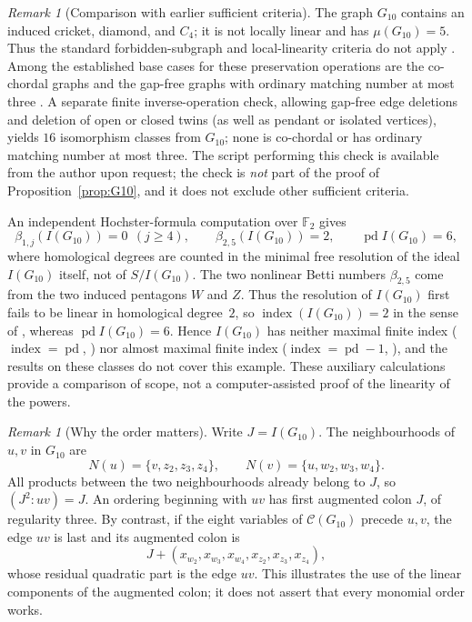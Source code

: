 \documentclass[11pt,a4paper]{article}
\theoremstyle{remark}\newtheorem{remark}[theorem]{Remark}
\newcommand{\pd}{\operatorname{pd}}
\newcommand{\Good}{\mathcal C}
\begin{document}
\begin{remark}[Comparison with earlier sufficient criteria]\label{rem:priority}
The graph $G_{10}$ contains an induced cricket, diamond, and $C_4$; it is not locally linear and has $\mu(G_{10})=5$. Thus the standard forbidden-subgraph and local-linearity criteria do not apply \cite{Banerjee,EreyDiamond,EreyC4,BBH}. Among the established base cases for these preservation operations are the co-chordal graphs \cite{HHZ} and the gap-free graphs with ordinary matching number at most three \cite{EHHKM}. A separate finite inverse-operation check, allowing gap-free edge deletions and deletion of open or closed twins (as well as pendant or isolated vertices), yields $16$ isomorphism classes from $G_{10}$; none is co-chordal or has ordinary matching number at most three. The script performing this check is available from the author upon request; the check is \emph{not} part of the proof of Proposition~\ref{prop:G10}, and it does not exclude other sufficient criteria.

An independent Hochster-formula computation over $\mathbb F_2$ gives
\[
 \beta_{1,j}(I(G_{10}))=0\ \ (j\ge4),\qquad \beta_{2,5}(I(G_{10}))=2,\qquad \pd I(G_{10})=6,
\]
where homological degrees are counted in the minimal free resolution of the ideal $I(G_{10})$ itself, not of $S/I(G_{10})$. The two nonlinear Betti numbers $\beta_{2,5}$ come from the two induced pentagons $W$ and $Z$. Thus the resolution of $I(G_{10})$ first fails to be linear in homological degree~$2$, so $\operatorname{index}(I(G_{10}))=2$ in the sense of \cite{BigdeliHZ}, whereas $\pd I(G_{10})=6$. Hence $I(G_{10})$ has neither maximal finite index ($\operatorname{index}=\pd$, \cite{BigdeliHZ}) nor almost maximal finite index ($\operatorname{index}=\pd-1$, \cite{Bigdeli}), and the results on these classes do not cover this example. These auxiliary calculations provide a comparison of scope, not a computer-assisted proof of the linearity of the powers.
\end{remark}

\begin{remark}[Why the order matters]
Write $J=I(G_{10})$. The neighbourhoods of $u,v$ in $G_{10}$ are
\[
 N(u)=\{v,z_2,z_3,z_4\},\qquad N(v)=\{u,w_2,w_3,w_4\}.
\]
All products between the two neighbourhoods already belong to $J$, so $(J^2:uv)=J$. An ordering beginning with $uv$ has first augmented colon $J$, of regularity three. By contrast, if the eight variables of $\Good(G_{10})$ precede $u,v$, the edge $uv$ is last and its augmented colon is
\[
 J+(x_{w_2},x_{w_3},x_{w_4},x_{z_2},x_{z_3},x_{z_4}),
\]
whose residual quadratic part is the edge $uv$. This illustrates the use of the linear components of the augmented colon; it does not assert that every monomial order works.
\end{remark}
\end{document}
